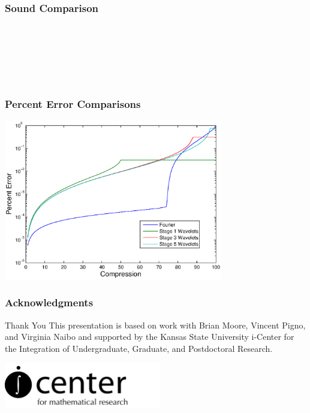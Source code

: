 \documentclass[10pt]{beamer}
\begin{document}
\begin{frame}
\frametitle{Sound Comparison}
\\
\\%
\\%
\\%
\\%
\end{frame}

\begin{frame}
\frametitle{Percent Error Comparisons}
\includegraphics[height=7cm]{error.eps}
\end{frame}

\begin{frame}
\frametitle{Acknowledgments}
\begin{block}{Thank You}
This presentation is based on work with Brian Moore, Vincent Pigno, and Virginia Naibo and supported by the Kansas State University i-Center for the Integration of Undergraduate, Graduate, and Postdoctoral Research.
\end{block}
\includegraphics[height=2cm]{icenterlogo2}
\end{frame}
\end{document}
